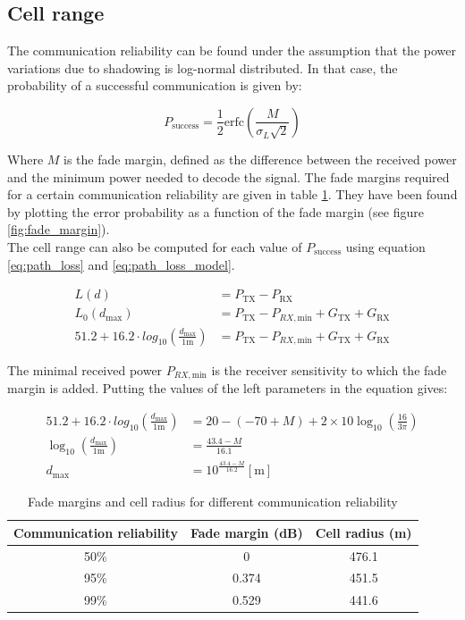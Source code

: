 \documentclass[10pt,a4paper]{ULBreport}
\begin{document}
\subsection{Cell range}
\label{sec:cell_range}
The communication reliability can be found under the assumption that the power variations due to shadowing is log-normal distributed. In that case, the probability of a successful communication is given by:

\begin{equation}
    \label{eq:path_loss_probability}
    P_{\text{success}} = \frac{1}{2} \text{erfc}\left(\frac{M}{\sigma_L\sqrt{2}}\right) 
\end{equation}

Where $M$ is the fade margin, defined as the difference between the received power and the minimum power needed to decode the signal. The fade margins required for a certain communication reliability are given in table \ref{tab:fade_margins}. They have been found by plotting the error probability as a function of the fade margin (see figure \ref{fig:fade_margin}). \\
The cell range can also be computed for each value of $P_{\text{success}}$ using equation \ref{eq:path_loss} and \ref{eq:path_loss_model}. 

\begin{align*}
    L(d) &= P_{\text{TX}} - P_{\text{RX}}\\
    L_0(d_\text{max}) &= P_{\text{TX}} - P_{RX, \text{min}} + G_{\text{TX}} + G_{\text{RX}}\\
    51.2 + 16.2 \cdot log_{10} \left(\frac{d_{\text{max}}}{1\text{m}}\right) &= P_{\text{TX}} - P_{RX, \text{min}} + G_{\text{TX}} + G_{\text{RX}}
\end{align*}

The minimal received power $P_{RX, \text{min}}$ is the receiver sensitivity to which the fade margin is added. Putting the values of the left parameters in the equation gives:

\begin{align*}
    51.2 + 16.2 \cdot log_{10} \left(\frac{d_{\text{max}}}{1\text{m}}\right) &= 20 - (-70 + M) + 2 \times 10 \log_{10} \left(\frac{16}{3\pi}\right)\\
    \log_{10} \left(\frac{d_{\text{max}}}{1\text{m}}\right) &= \frac{43.4 - M}{16.1}\\
    d_{\text{max}} &= 10^{\frac{43.4 - M}{16.2}} \left[\text{m}\right]
\end{align*}

\begin{table}[H]
    \centering
    \begin{tabular}{|c c c|}
        \hline
        Communication reliability & Fade margin (dB) & Cell radius (m) \\ \hline
        50\% & 0 & 476.1 \\ \hline
        95\% & 0.374 & 451.5 \\ \hline
        99\% & 0.529 & 441.6 \\ \hline
    \end{tabular}
    \caption{Fade margins and cell radius for different communication reliability}
    \label{tab:fade_margins}
\end{table}
\end{document}
